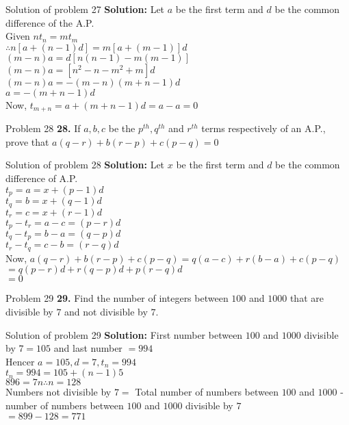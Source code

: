 \documentclass[aspectratio=1610,8pt]{beamer}
\begin{document}
\begin{frame}{Solution of problem 27}
  \textbf{Solution:} Let $a$ be the first term and $d$ be the common difference of the A.P.\\
  Given $nt_n = mt_m$\\
  $\therefore n[a + (n - 1)d] = m[a + (m - 1)]d$\\
  $(m - n)a = d[n(n - 1) - m(m - 1)]$\\
  $(m - n)a = [n^2 - n - m^2 + m]d$\\
  $(m - n)a = -(m - n)(m + n - 1)d$\\
  $a = -(m + n - 1)d$\\
  Now, $t_{m + n} = a + (m + n - 1)d = a - a = 0$
\end{frame}
\begin{frame}{Problem 28}
  \textbf{28.} If $a, b, c$ be the $p^{th}, q^{th}$ and $r^{th}$ terms respectively of an
  A.P., prove that $a(q - r) + b(r - p) + c(p - q) = 0$
\end{frame}
\begin{frame}{Solution of problem 28}
  \textbf{Solution:} Let $x$ be the first term and $d$ be the common difference
  of A.P.\\
  $t_p = a = x + (p - 1)d$\\
  $t_q = b = x + (q - 1)d$\\
  $t_r = c = x + (r - 1)d$\\
  $t_p - t_r = a - c = (p - r)d$\\
  $t_q - t_p = b - a = (q - p)d$\\
  $t_r - t_q = c - b = (r - q)d$\\
  Now, $a(q - r) + b(r - p) + c(p - q) = q(a - c) + r(b - a) + c(p - q)$\\
  $= q(p - r)d + r(q - p)d + p(r - q)d$\\
  $= 0$
\end{frame}
\begin{frame}{Problem 29}
  \textbf{29.} Find the number of integers between $100$ and $1000$ that are
  divisible by $7$ and not divisible by $7.$
\end{frame}
\begin{frame}{Solution of problem 29}
  \textbf{Solution:} First number between $100$ and $1000$ divisible by $7 =
  105$ and last number $= 994$\\
  Hencer $a = 105, d = 7, t_n = 994$\\
  $t_n = 994 = 105 + (n - 1)5$\\
  $896 = 7n \therefore n = 128$\\
  Numbers not divisible by $7 = $ Total number of numbers between $100$ and
  $1000$ - number of numbers between $100$ and $1000$ divisible by $7$\\
  $= 899 - 128 = 771$
\end{frame}
\end{document}
